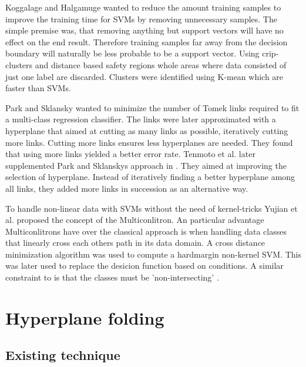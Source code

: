 \documentclass[a4paper,twoside]{bth}
\begin{document}
\par Koggalage and Halgamuge \cite{reducetraining} wanted to reduce the amount training samples to improve the training time for SVMs by removing unnecessary samples. The simple premise was, that removing anything but support vectors will have no effect on the end result. Therefore training samples far away from the decision boundary will naturally be less probable to be a support vector. Using crip-clusters and distance based safety regions whole areas where data consisted of just one label are discarded. Clusters were identified using K-mean which are faster than SVMs.

\par Park and Sklansky wanted to minimize the number of Tomek links required to fit a multi-class regression classifier\cite{parksklansky}. The links were later approximated with a hyperplane that aimed at cutting as many links as possible, iteratively cutting more links. Cutting more links ensures less hyperplanes are needed. They found that using more links yielded a better error rate. Tenmoto et al. later supplemented Park and Sklanskys approach in \cite{tenmoto}. They aimed at improving the selection of hyperplane. Instead of iteratively finding a better hyperplane among all links, they added more links in succession as an alternative way. 

\par To handle non-linear data with SVMs without the need of kernel-tricks Yujian et al. \cite{multiconlitron} proposed the concept of the Multiconlitron. An particular advantage Multiconlitrons have over the classical approach is when handling data classes that linearly cross each others path in its data domain. A cross distance minimization algorithm was used to compute a hardmargin non-kernel SVM. This was later used to replace the desicion function based on conditions. A similar constraint to \cite{unpublished} is that the classes must be 'non-intersecting' \cite{multiconlitron}. 

\chapter{Hyperplane folding}

\section{Existing technique}
\end{document}
